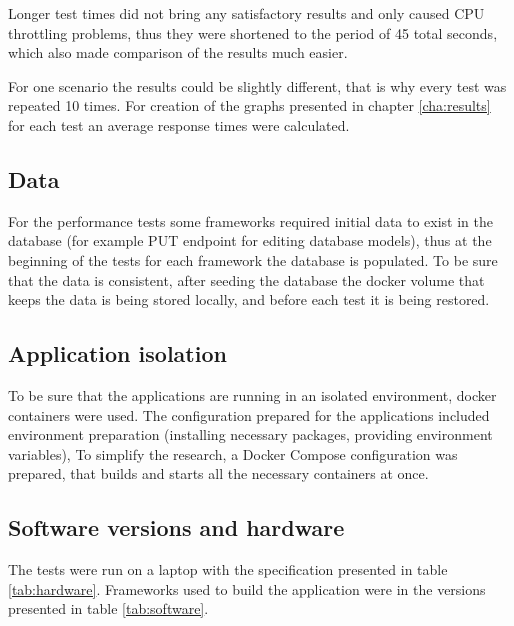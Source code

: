 Longer test times did not bring any satisfactory results and only caused CPU throttling problems, thus they were shortened to the period of 45 total seconds, which also made comparison of the results much easier.

For one scenario the results could be slightly different, that is why every test was repeated 10 times. For creation of the graphs presented in chapter \ref{cha:results} for each test an average response times were calculated.



\subsection{Data}\label{sub:population}

For the performance tests some frameworks required initial data to exist in the database (for example PUT endpoint for editing database models), thus at the beginning of the tests for each framework the database is populated. To be sure that the data is consistent, after seeding the database the docker volume that keeps the data is being stored locally, and before each test it is being restored.

\subsection{Application isolation}

To be sure that the applications are running in an isolated environment, docker containers were used. The configuration prepared for the applications included environment preparation (installing necessary packages, providing environment variables), To simplify the research, a Docker Compose configuration was prepared, that builds and starts all the necessary containers at once.

\subsection{Software versions and hardware}

The tests were run on a laptop with the specification presented in table \ref{tab:hardware}.
Frameworks used to build the application were in the versions presented in table \ref{tab:software}.





